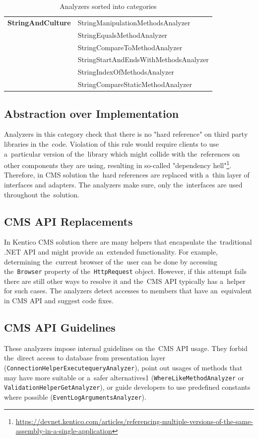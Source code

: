 \documentclass[
  digital, %
  table,   %
  lof,     %
  lot,     %
  oneside,
]{fithesis3}
\begin{document}
\begin{table}
{\begin{tabularx}{1.038\textwidth}{ll}
\textbf{StringAndCulture}
  & StringManipulationMethodsAnalyzer \\
  & StringEqualsMethodAnalyzer \\
  & StringCompareToMethodAnalyzer \\
  & StringStartAndEndsWithMethodsAnalyzer \\
  & StringIndexOfMethodsAnalyzer \\
  & StringCompareStaticMethodAnalyzer \\
\bottomrule
\end{tabularx}
}
\caption{Analyzers sorted into categories}
\label{tab:analyzer-categories-compact-table}
\end{table}

\subsection{Abstraction over Implementation}
Analyzers in this category check that there is no "hard reference" on third party libraries in the~code. Violation of this rule would require clients to use a~particular version of the~library which might collide with the~references on other components they are using, resulting in so-called "dependency hell"\footnote{\url{https://devnet.kentico.com/articles/referencing-multiple-versions-of-the-same-assembly-in-a-single-application}}. Therefore, in CMS solution the~hard references are replaced with a~thin layer of interfaces and adapters. The analyzers make sure, only the~interfaces are used throughout the~solution.

\subsection{CMS API Replacements}
In Kentico CMS solution there are many helpers that encapsulate the~traditional .NET API and might provide an~extended functionality. For example, determining the~current browser of the~user can be done by accessing the~\texttt{Browser} property of the~\texttt{HttpRequest} object. However, if this attempt fails there are still other ways to resolve it and the~CMS API typically has a~helper for such cases. The analyzers detect accesses to members that have an~equivalent in CMS API and suggest code fixes. 

\subsection{CMS API Guidelines}
These analyzers impose internal guidelines on the~CMS API usage. They forbid the~direct access to database from presentation layer (\texttt{ConnectionHelperExecutequeryAnalyzer}), point out usages of methods that may have more suitable or a~safer alternatives1 (\texttt{WhereLikeMethodAnalyzer} or \texttt{ValidationHelperGetAnalyzer}), or guide developers to use predefined constants where possible (\texttt{EventLogArgumentsAnalyzer}).
\end{document}
